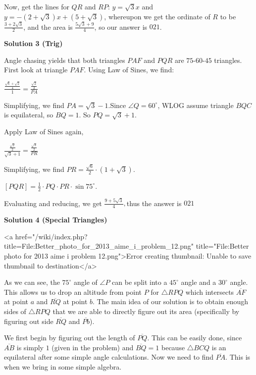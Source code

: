 \begin{enumerate}
 Now, get the lines for $QR$ and $RP$: $y=\sqrt{3}x$ and $y=-(2+\sqrt{3})x + (5+\sqrt{3})$, whereupon we get the ordinate of $R$ to be $\frac{3+2\sqrt{3}}{2}$, and the area is $\frac{5\sqrt{3} + 9}{4}$, so our answer is $\boxed{021}$.

 



\textbf{Solution 3 (Trig)}

Angle chasing yields that both triangles $PAF$ and $PQR$ are $75$-$60$-$45$ triangles. First look at triangle $PAF$. Using Law of Sines, we find:

 $\frac{\frac{\sqrt{6} + \sqrt{2}}{4}}{1} = \frac{\frac{\sqrt{2}}{2}}{PA}$

 Simplifying, we find $PA = \sqrt{3} - 1$.Since $\angle{Q} = 60^\circ$, WLOG assume triangle $BQC$ is equilateral, so $BQ = 1$. So $PQ = \sqrt{3} + 1$.

 Apply Law of Sines again, 

 $\frac{\frac{\sqrt{2}}{2}}{\sqrt{3} + 1} = \frac{\frac{\sqrt{3}}{2}}{PR}$

 Simplifying, we find $PR = \frac{\sqrt{6}}{2} \cdot (1 + \sqrt{3})$. 

 $[PQR] = \frac{1}{2} \cdot PQ \cdot PR \cdot \sin 75^\circ$. 

 Evaluating and reducing, we get $\frac{9 + 5\sqrt{3}}{4},$thus the answer is $\boxed{021}$




\textbf{Solution 4 (Special Triangles)}

<a href="/wiki/index.php?title=File:Better\_photo\_for\_2013\_aime\_i\_problem\_12.png" title="File:Better photo for 2013 aime i problem 12.png">Error creating thumbnail: Unable to save thumbnail to destination</a>

 As we can see, the $75^\circ$ angle of $\angle P$ can be split into a $45^\circ$ angle and a $30^\circ$ angle. This allows us to drop an altitude from point $P$ for $\triangle RPQ$ which intersects $\overline{AF}$ at point $a$ and $\overline{RQ}$ at point $b$. The main idea of our solution is to obtain enough sides of $\triangle RPQ$ that we are able to directly figure out its area (specifically by figuring out side $\overline{RQ}$ and $\overline{Pb}$). 

 We first begin by figuring out the length of $\overline{PQ}$. This can be easily done, since $\overline{AB}$ is simply $1$ (given in the problem) and $\overline{BQ}=1$ because $\triangle BCQ$ is an equilateral after some simple angle calculations. Now we need to find $\overline{PA}$. This is when we bring in some simple algebra. 


\end{enumerate}
